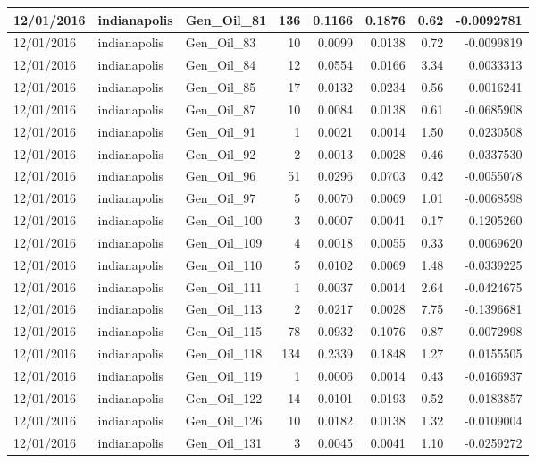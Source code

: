 \documentclass[
  letterpaper,
  DIV=11,
  numbers=noendperiod]{scrartcl}
\begin{document}
\begin{tabular}{l|l|l|r|r|r|r|r}
\hline
12/01/2016 & indianapolis & Gen\_Oil\_81 & 136 & 0.1166 & 0.1876 & 0.62 & -0.0092781\\
\hline
12/01/2016 & indianapolis & Gen\_Oil\_83 & 10 & 0.0099 & 0.0138 & 0.72 & -0.0099819\\
\hline
12/01/2016 & indianapolis & Gen\_Oil\_84 & 12 & 0.0554 & 0.0166 & 3.34 & 0.0033313\\
\hline
12/01/2016 & indianapolis & Gen\_Oil\_85 & 17 & 0.0132 & 0.0234 & 0.56 & 0.0016241\\
\hline
12/01/2016 & indianapolis & Gen\_Oil\_87 & 10 & 0.0084 & 0.0138 & 0.61 & -0.0685908\\
\hline
12/01/2016 & indianapolis & Gen\_Oil\_91 & 1 & 0.0021 & 0.0014 & 1.50 & 0.0230508\\
\hline
12/01/2016 & indianapolis & Gen\_Oil\_92 & 2 & 0.0013 & 0.0028 & 0.46 & -0.0337530\\
\hline
12/01/2016 & indianapolis & Gen\_Oil\_96 & 51 & 0.0296 & 0.0703 & 0.42 & -0.0055078\\
\hline
12/01/2016 & indianapolis & Gen\_Oil\_97 & 5 & 0.0070 & 0.0069 & 1.01 & -0.0068598\\
\hline
12/01/2016 & indianapolis & Gen\_Oil\_100 & 3 & 0.0007 & 0.0041 & 0.17 & 0.1205260\\
\hline
12/01/2016 & indianapolis & Gen\_Oil\_109 & 4 & 0.0018 & 0.0055 & 0.33 & 0.0069620\\
\hline
12/01/2016 & indianapolis & Gen\_Oil\_110 & 5 & 0.0102 & 0.0069 & 1.48 & -0.0339225\\
\hline
12/01/2016 & indianapolis & Gen\_Oil\_111 & 1 & 0.0037 & 0.0014 & 2.64 & -0.0424675\\
\hline
12/01/2016 & indianapolis & Gen\_Oil\_113 & 2 & 0.0217 & 0.0028 & 7.75 & -0.1396681\\
\hline
12/01/2016 & indianapolis & Gen\_Oil\_115 & 78 & 0.0932 & 0.1076 & 0.87 & 0.0072998\\
\hline
12/01/2016 & indianapolis & Gen\_Oil\_118 & 134 & 0.2339 & 0.1848 & 1.27 & 0.0155505\\
\hline
12/01/2016 & indianapolis & Gen\_Oil\_119 & 1 & 0.0006 & 0.0014 & 0.43 & -0.0166937\\
\hline
12/01/2016 & indianapolis & Gen\_Oil\_122 & 14 & 0.0101 & 0.0193 & 0.52 & 0.0183857\\
\hline
12/01/2016 & indianapolis & Gen\_Oil\_126 & 10 & 0.0182 & 0.0138 & 1.32 & -0.0109004\\
\hline
12/01/2016 & indianapolis & Gen\_Oil\_131 & 3 & 0.0045 & 0.0041 & 1.10 & -0.0259272\\

\end{tabular}
\end{document}
